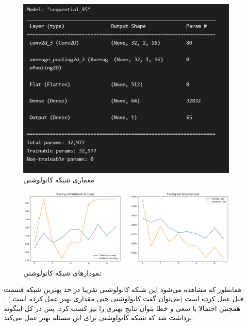 \documentclass{article}
\begin{document}
\begin{figure}[!h]
    \centering\includegraphics[scale=.55]{./p3-1}
    \caption{معماری شبکه کانولوشنی}\label{fig.31}
\end{figure}

\begin{figure}[!h]
    \centering\includegraphics[scale=.40]{./p3-2}
    \caption{نمودارهای شبکه کانولوشنی}\label{fig.32}
\end{figure}

\cleardoublepage

همانطور که مشاهده می‌شود این شبکه کانولوشنی تقریبا در حد بهترین شبکه قسمت قبل عمل کرده است (می‌توان گفت کانولوشنی حتی مقداری بهتر عمل کرده است.) . همچنین احتمالا با سعی و خطا بتوان نتایج بهتری را نیز کسب کرد. پس در کل اینگونه برداشت شد که شبکه کانولوشنی برای این مسئله بهتر عمل می‌کند.

\end{document}
